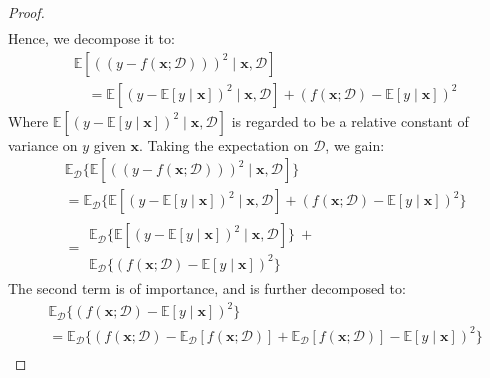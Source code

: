 \begin{proof}
\begin{equation}
\begin{split}
        \end{split}
    \end{equation}
    Hence, we decompose it to: 
    \begin{equation}
        \begin{split}
            &\mathbb{E} \left[((y-f(\mathbf{x};\mathcal{D})))^{2}\mid \mathbf{x}, \mathcal{D}\right] \\
            & \quad = \mathbb{E}\left[(y-\mathbb{E}[y\mid \mathbf{x}])^{2}\mid \mathbf{x},\mathcal{D}\right] + (f(\mathbf{x};\mathcal{D})-\mathbb{E}[y\mid \mathbf{x}])^{2}
        \end{split}
    \end{equation}
    Where $\mathbb{E}\left[(y-\mathbb{E}[y\mid \mathbf{x}])^{2}\mid \mathbf{x},\mathcal{D}\right]$ is regarded to be a relative constant of variance on $y$ given $\mathbf{x}$. Taking the expectation on $\mathcal{D}$, we gain: 
    \begin{equation}
        \begin{split}
            &\mathbb{E}_{\mathcal{D}} \Big\{ \mathbb{E} \left[((y-f(\mathbf{x};\mathcal{D})))^{2}\mid \mathbf{x}, \mathcal{D}\right]\Big\} \\
            & = \mathbb{E}_{\mathcal{D}} \Big\{\mathbb{E}\left[(y-\mathbb{E}[y\mid \mathbf{x}])^{2}\mid \mathbf{x},\mathcal{D}\right] + (f(\mathbf{x};\mathcal{D})-\mathbb{E}[y\mid \mathbf{x}])^{2}\Big\}\\
            & = \begin{multlined}
                \mathbb{E}_{\mathcal{D}} \Big\{ \mathbb{E}\left[(y-\mathbb{E}[y\mid \mathbf{x}])^{2}\mid \mathbf{x},\mathcal{D}\right]\Big\} \: + \\ \mathbb{E}_{\mathcal{D}} \Big\{ (f(\mathbf{x};\mathcal{D})-\mathbb{E}[y\mid \mathbf{x}])^{2}\Big\}
            \end{multlined}
        \end{split}
    \end{equation}
    The second term is of importance, and is further decomposed to: 
    \begin{equation}
        \begin{split}
            & \mathbb{E}_{\mathcal{D}} \Big\{ (f(\mathbf{x};\mathcal{D})-\mathbb{E}[y\mid \mathbf{x}])^{2}\Big\} \\ 
            & = \mathbb{E}_{\mathcal{D}} \Big\{ (f(\mathbf{x};\mathcal{D})- \mathbb{E}_{\mathcal{D}}[f(\mathbf{x};\mathcal{D})] + \mathbb{E}_{\mathcal{D}}[f(\mathbf{x};\mathcal{D})] -\mathbb{E}[y\mid \mathbf{x}])^{2}\Big\} \\

\end{split}
\end{equation}
\end{proof}
